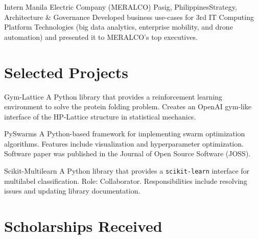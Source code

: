 \documentclass[12pt,a4paper,sans]{moderncv}
\begin{document}
        {Intern}
        {Manila Electric Company (MERALCO)}
        {Pasig, Philippines}{Strategy, Architecture \& Governance}
        {
        Developed business use-cases for 3rd IT Computing Platform
        Technologies (big data analytics, enterprise mobility, and drone
        automation) and presented it to MERALCO's top executives.
        }

\newpage
\section{Selected Projects}

        {\color{blue} }
        {Gym-Lattice}{}{}
        {
        A Python library that provides a reinforcement learning environment
        to solve the protein folding problem. Creates an OpenAI gym-like
        interface of the HP-Lattice structure in statistical mechanics.
        }

        {\color{blue} }
        {PySwarms}{}{}
        {
        A Python-based framework for implementing swarm optimization
        algorithms. Features include visualization and hyperparameter
        optimization. Software paper was published in the Journal of Open
        Source Software (JOSS).
        }

        {\color{blue} }
        {Scikit-Multilearn}{}{}
        {
        A Python library that provides a \texttt{scikit-learn} interface for
        multilabel classification. Role: Collaborator. Responsibilities include
        resolving issues and updating library documentation.
        }

\section{Scholarships Received}
\nocite{*}


\end{document}
